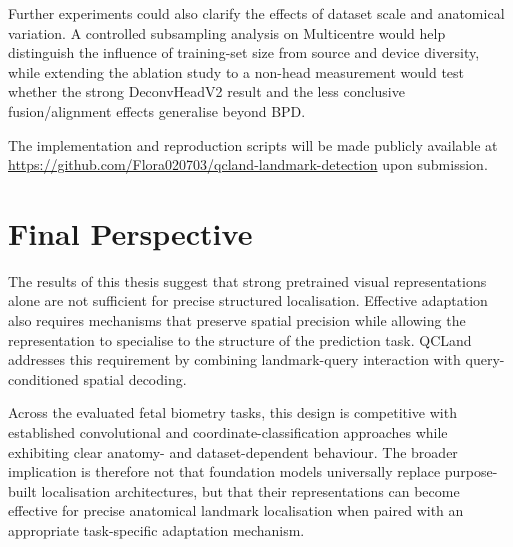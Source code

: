 Further experiments could also clarify the effects of dataset scale
and anatomical variation. A controlled subsampling analysis on
Multicentre would help distinguish the influence of training-set size
from source and device diversity, while extending the ablation study
to a non-head measurement would test whether the strong
DeconvHeadV2 result and the less conclusive fusion/alignment effects
generalise beyond BPD.

The implementation and reproduction scripts will be made publicly
available at
\url{https://github.com/Flora020703/qcland-landmark-detection}
upon submission.



\section{Final Perspective}
\label{sec:conclusion-closing}

The results of this thesis suggest that strong pretrained visual
representations alone are not sufficient for precise structured
localisation. Effective adaptation also requires mechanisms that
preserve spatial precision while allowing the representation to
specialise to the structure of the prediction task. QCLand addresses
this requirement by combining landmark-query interaction with
query-conditioned spatial decoding.

Across the evaluated fetal biometry tasks, this design is competitive
with established convolutional and coordinate-classification
approaches while exhibiting clear anatomy- and dataset-dependent
behaviour. The broader implication is therefore not that foundation
models universally replace purpose-built localisation architectures,
but that their representations can become effective for precise
anatomical landmark localisation when paired with an appropriate
task-specific adaptation mechanism.
